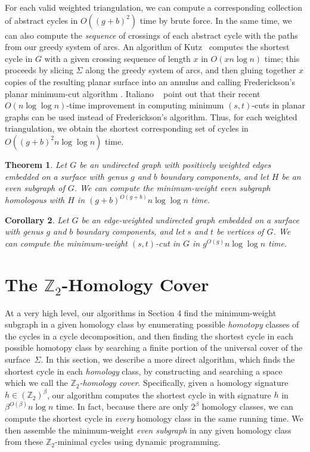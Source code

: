 \documentclass[11pt,twoside]{article}
\def\Z{\mathbb{Z}}
\newtheorem{theorem}{Theorem}[section]
\newtheorem{corollary}[theorem]{Corollary}
\begin{document}
For each valid weighted triangulation, we can compute a corresponding collection of abstract cycles in $O((g+b)^2)$ time by brute force.  In the same time, we can also compute the \emph{sequence} of crossings of each abstract cycle with the paths from our greedy system of arcs.  An algorithm of Kutz~\cite{k-csnco-06} computes the shortest cycle in $G$ with a given crossing sequence of length $x$ in $O(x n \log n)$ time; this proceeds by slicing $\Sigma$ along the greedy system of arcs, and then gluing together $x$ copies of the resulting planar surface into an annulus and calling Frederickson's planar minimum-cut algorithm \cite{f-faspp-87}.
Italiano \etal~\cite{insw-iamcmf-11} point out that their recent $O(n \log \log n)$-time improvement in computing minimum $(s,t)$-cuts in planar graphs can be used instead of Frederickson's algorithm. 
Thus, for each weighted triangulation, we obtain the shortest corresponding set of cycles in $O((g+b)^2 n \log \log n)$ time.

\begin{theorem}
\label{Th:Z2-minimal-crossing}
Let $G$ be an undirected graph with positively weighted edges embedded on a surface with genus $g$ and $b$ boundary components, and let $H$ be an even subgraph of $G$. We can compute the minimum-weight even subgraph homologous with $H$ in $(g+b)^{O(g+b)} n\log \log n$ time.
\end{theorem}

\begin{corollary}
\label{C:min-cut-crossing}
Let $G$ be an edge-weighted undirected graph embedded on a surface with genus $g$ and $b$ boundary components, and let $s$ and $t$ be vertices of $G$.  We can compute the minimum-weight $(s,t)$-cut in $G$ in $g^{O(g)} n\log \log n$ time.
\end{corollary}

\section{The $\Z_2$-Homology Cover}
\label{sec:homcover}


At a very high level, our algorithms in Section 4 find the minimum-weight subgraph in a given homology class by enumerating possible \emph{homotopy} classes of the cycles in a cycle decomposition, and then finding the shortest cycle in each possible homotopy class by searching a finite portion of the universal cover of the surface~$\Sigma$.  In this section, we describe a more direct algorithm, which finds the shortest cycle in each \emph{homology} class, by constructing and searching a space which we call the \emph{$\Z_2$-homology cover}.
Specifically, given a homology signature $h\in (\Z_2)^\beta$, our algorithm computes the shortest cycle in with signature $h$ in $\beta^{O(\beta)} n \log n$ time.
In fact, because there are only $2^\beta$ homology classes, we can compute the shortest cycle in \emph{every} homology class in the same running time.
We then assemble the minimum-weight \emph{even subgraph} in any given homology class from these $\Z_2$-minimal cycles using dynamic programming.
 
\end{document}
